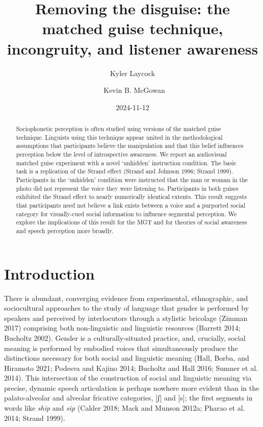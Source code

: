 \documentclass[
  letterpaper,
  DIV=11,
  numbers=noendperiod]{scrartcl}
\title{Removing the disguise: the matched guise technique, incongruity,
and listener awareness}
\author{Kyler Laycock \and ~Kevin B. McGowan}
\date{2024-11-12}
\begin{document}
\maketitle
\begin{abstract}
Sociophonetic perception is often studied using versions of the matched
guise technique. Linguists using this technique appear united in the
methodological assumptions that participants believe the manipulation
and that this belief influences perception below the level of
introspective awareness. We report an audiovisual matched guise
experiment with a novel `unhidden' instruction condition. The basic task
is a replication of the Strand effect (Strand and Johnson 1996; Strand
1999). Participants in the `unhidden' condition were instructed that the
man or woman in the photo did not represent the voice they were
listening to. Participants in both guises exhibited the Strand effect to
nearly numerically identical extents. This result suggests that
participants need not believe a link exists between a voice and a
purported social category for visually-cued social information to
influence segmental perception. We explore the implications of this
result for the MGT and for theories of social awareness and speech
perception more broadly.
\end{abstract}


\section{Introduction}\label{sec-intro}

There is abundant, converging evidence from experimental, ethnographic,
and sociocultural approaches to the study of language that gender is
performed by speakers and perceived by interlocutors through a stylistic
bricolage (Zimman 2017) comprising both non-linguistic and linguistic
resources (Barrett 2014; Bucholtz 2002). Gender is a culturally-situated
practice, and, crucially, social meaning is performed by embodied voices
that simultaneously produce the distinctions necessary for both social
and linguistic meaning (Hall, Borba, and Hiramoto 2021; Podesva and
Kajino 2014; Bucholtz and Hall 2016; Sumner et al. 2014). This
intersection of the construction of social and linguistic meaning via
precise, dynamic speech articulation is perhaps nowhere more evident
than in the palato-alveolar and alveolar fricative categories, {[}ʃ{]}
and {[}s{]}; the first segments in words like \emph{ship} and \emph{sip}
(Calder 2018; Mack and Munson 2012a; Pharao et al. 2014; Strand 1999).
\end{document}
